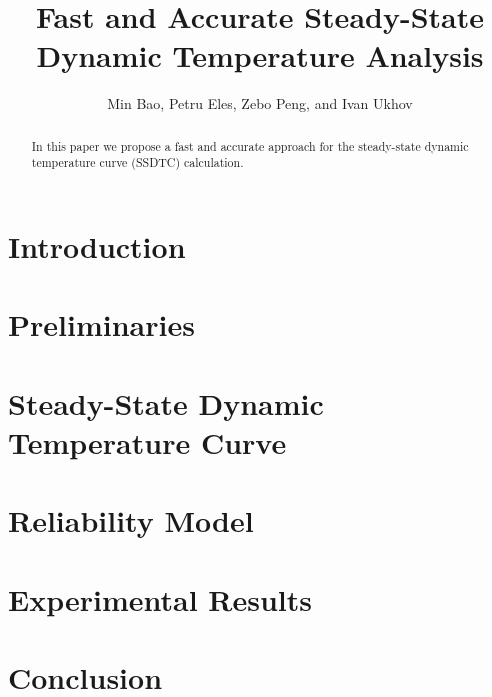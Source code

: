 \documentclass[conference]{IEEEtran}
\title{Fast and Accurate Steady-State\\Dynamic Temperature Analysis}
\author{Min Bao, Petru Eles, Zebo Peng, and Ivan Ukhov}
\newcommand{\ssdtc}{Steady-State Dynamic Temperature Curve}
\begin{document}
  \maketitle

  \begin{abstract}
    In this paper we propose a fast and accurate approach for the steady-state dynamic temperature curve (SSDTC) calculation.
  \end{abstract}

  \section{Introduction}
  

  \section{Preliminaries}
  

  \section{\ssdtc}
  

  \section{Reliability Model}
  

  \section{Experimental Results} \label{sec:results}
  

  \section{Conclusion}
  

  
\end{document}
